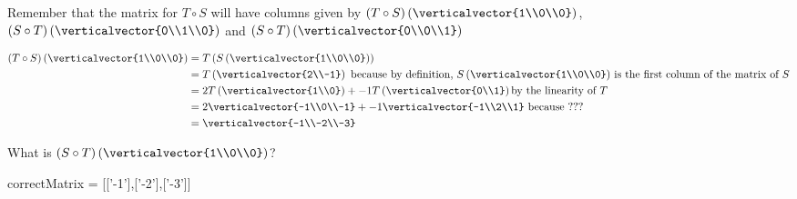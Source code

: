 \documentclass{ximera}
\begin{document}
\begin{question}
\begin{solution}
\begin{hint}
	Remember that the matrix for $T \circ S$ will have columns given by $(T \circ S)\left(\verticalvector{1\\0\\0}\right)$,  $(S \circ T)\left(\verticalvector{0\\1\\0}\right)$ and 
	$(S \circ T)\left(\verticalvector{0\\0\\1}\right)$
\end{hint}
\begin{hint}
	\begin{question}
		\begin{solution}
		\begin{hint}
			\begin{align*}
				(T \circ S)\left(\verticalvector{1\\0\\0}\right) &= T\left(S\left(\verticalvector{1\\0\\0}\right)\right)\\
				&= T\left(\verticalvector{2\\-1}\right) \text{ because by definition, $S\left(\verticalvector{1\\0\\0}\right)$ is the first column of the matrix of $S$}\\
				&=2T\left(\verticalvector{1\\0}\right) +-1 T\left(\verticalvector{0\\1}\right) \text{by the linearity of $T$}\\
				&=2\verticalvector{-1\\0\\-1}+-1\verticalvector{-1\\2\\1} \text{ because ???}\\
				&=\verticalvector{-1\\-2\\-3}
			\end{align*}
		\end{hint}
		What is  $(S \circ T)\left(\verticalvector{1\\0\\0}\right)$?
			\begin{matrix-answer}[name=M]
 			   correctMatrix = [['-1'],['-2'],['-3']]
 			 \end{matrix-answer}
		\end{solution}
		

\end{question}
\end{hint}
\end{solution}
\end{question}
\end{document}

